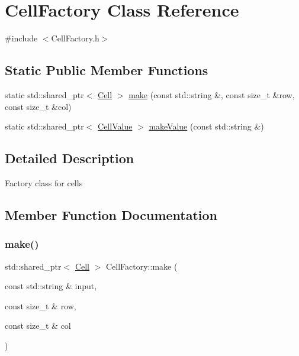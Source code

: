 \hypertarget{classCellFactory}{}\section{Cell\+Factory Class Reference}
\label{classCellFactory}


{\ttfamily \#include $<$Cell\+Factory.\+h$>$}

\subsection*{Static Public Member Functions}
\begin{DoxyCompactItemize}
\item 
static std\+::shared\+\_\+ptr$<$ \hyperlink{classCell}{Cell} $>$ \hyperlink{classCellFactory_a40b3d3a3e2250f90b45d490f21d4374b}{make} (const std\+::string \&, const size\+\_\+t \&row, const size\+\_\+t \&col)
\item 
static std\+::shared\+\_\+ptr$<$ \hyperlink{classCellValue}{Cell\+Value} $>$ \hyperlink{classCellFactory_af112ed8e49626db7d872db0d75409aa3}{make\+Value} (const std\+::string \&)
\end{DoxyCompactItemize}


\subsection{Detailed Description}
Factory class for cells 

\subsection{Member Function Documentation}
\mbox{\label{classCellFactory_a40b3d3a3e2250f90b45d490f21d4374b}} 
\subsubsection{\texorpdfstring{make()}{make()}}
{\footnotesize\ttfamily std\+::shared\+\_\+ptr$<$ \hyperlink{classCell}{Cell} $>$ Cell\+Factory\+::make (\begin{DoxyParamCaption}\item[{const std\+::string \&}]{input,  }\item[{const size\+\_\+t \&}]{row,  }\item[{const size\+\_\+t \&}]{col }\end{DoxyParamCaption})\hspace{0.3cm}{\ttfamily [static]}}

